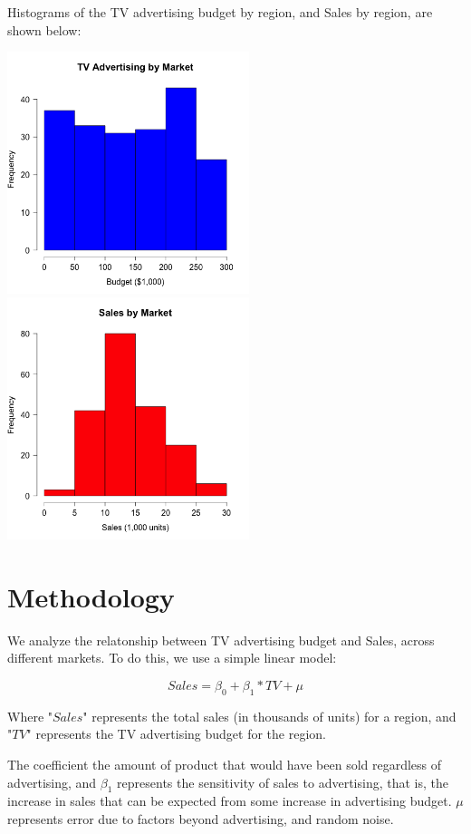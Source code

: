 \documentclass{article}
\begin{document}
Histograms of the TV advertising budget by region, and Sales by region, are shown below:

\includegraphics[width=200pt]{../images/histogram-tv.png}
\includegraphics[width=200pt]{../images/histogram-sales.png}

\section{Methodology}

We analyze the relatonship between TV advertising budget and Sales, across different markets. To do this, we use a simple linear model:

$$Sales = \beta_0 + \beta_1 * TV + \mu$$

Where "$Sales$" represents the total sales (in thousands of units) for a region, and "$TV$" represents the TV advertising budget for the region.

The coefficient the amount of product that would have been sold regardless of advertising, and $\beta_1$ represents the sensitivity of sales to advertising, that is, the increase in sales that can be expected from some increase in advertising budget. $\mu$ represents error due to factors beyond advertising, and random noise.
\end{document}
